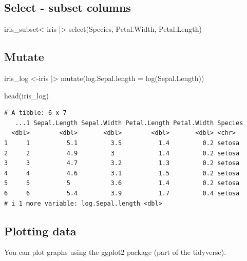 \documentclass[
  letterpaper,
  DIV=11,
  numbers=noendperiod,
  oneside]{scrartcl}
\newenvironment{Shaded}{\begin{snugshade}}{\end{snugshade}}
\newcommand{\AttributeTok}[1]{\textcolor[rgb]{0.40,0.45,0.13}{#1}}
\newcommand{\FunctionTok}[1]{\textcolor[rgb]{0.28,0.35,0.67}{#1}}
\newcommand{\NormalTok}[1]{\textcolor[rgb]{0.00,0.23,0.31}{#1}}
\newcommand{\OtherTok}[1]{\textcolor[rgb]{0.00,0.23,0.31}{#1}}
\newcommand{\SpecialCharTok}[1]{\textcolor[rgb]{0.37,0.37,0.37}{#1}}
\begin{document}
\subsection{Select - subset columns}\label{select---subset-columns}

\begin{Shaded}
\begin{Highlighting}[]
\NormalTok{iris\_subset}\OtherTok{\textless{}{-}}\NormalTok{iris }\SpecialCharTok{|\textgreater{}} \FunctionTok{select}\NormalTok{(Species, Petal.Width, Petal.Length)}
\end{Highlighting}
\end{Shaded}

\subsection{Mutate}\label{mutate}

\begin{Shaded}
\begin{Highlighting}[]
\NormalTok{iris\_log }\OtherTok{\textless{}{-}}\NormalTok{iris }\SpecialCharTok{|\textgreater{}} \FunctionTok{mutate}\NormalTok{(}\AttributeTok{log.Sepal.length =} \FunctionTok{log}\NormalTok{(Sepal.Length))}

\FunctionTok{head}\NormalTok{(iris\_log)}
\end{Highlighting}
\end{Shaded}

\begin{verbatim}
# A tibble: 6 x 7
   ...1 Sepal.Length Sepal.Width Petal.Length Petal.Width Species
  <dbl>        <dbl>       <dbl>        <dbl>       <dbl> <chr>  
1     1          5.1         3.5          1.4         0.2 setosa 
2     2          4.9         3            1.4         0.2 setosa 
3     3          4.7         3.2          1.3         0.2 setosa 
4     4          4.6         3.1          1.5         0.2 setosa 
5     5          5           3.6          1.4         0.2 setosa 
6     6          5.4         3.9          1.7         0.4 setosa 
# i 1 more variable: log.Sepal.length <dbl>
\end{verbatim}

\subsection{Plotting data}\label{plotting-data}

You can plot graphs using the ggplot2 package (part of the tidyverse).
\end{document}
